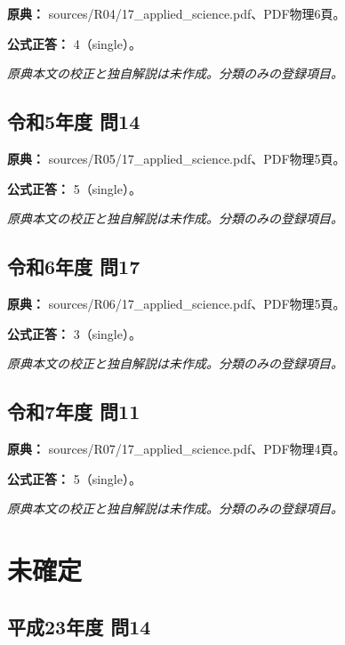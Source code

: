 \noindent\textbf{原典：} sources/R04/17\_applied\_science.pdf、PDF物理6頁。

\textbf{公式正答：} 4（single）。

\par\textit{原典本文の校正と独自解説は未作成。分類のみの登録項目。}

\subsection{令和5年度 問14}
\label{q:r05-reg-applied-14}

\noindent\textbf{原典：} sources/R05/17\_applied\_science.pdf、PDF物理5頁。

\textbf{公式正答：} 5（single）。

\par\textit{原典本文の校正と独自解説は未作成。分類のみの登録項目。}

\subsection{令和6年度 問17}
\label{q:r06-reg-applied-17}

\noindent\textbf{原典：} sources/R06/17\_applied\_science.pdf、PDF物理5頁。

\textbf{公式正答：} 3（single）。

\par\textit{原典本文の校正と独自解説は未作成。分類のみの登録項目。}

\subsection{令和7年度 問11}
\label{q:r07-reg-applied-11}

\noindent\textbf{原典：} sources/R07/17\_applied\_science.pdf、PDF物理4頁。

\textbf{公式正答：} 5（single）。

\par\textit{原典本文の校正と独自解説は未作成。分類のみの登録項目。}

\section{未確定}

\subsection{平成23年度 問14}
\label{q:h23-reg-applied-14}

